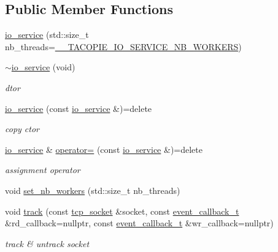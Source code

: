 \subsection*{Public Member Functions}
\begin{DoxyCompactItemize}
\item 
\hyperlink{classtacopie_1_1io__service_a62edde9b62571610413d99d075df8102}{io\+\_\+service} (std\+::size\+\_\+t nb\+\_\+threads=\hyperlink{io__service_8hpp_a822f465d034836ecbc765ad422eec064}{\+\_\+\+\_\+\+T\+A\+C\+O\+P\+I\+E\+\_\+\+I\+O\+\_\+\+S\+E\+R\+V\+I\+C\+E\+\_\+\+N\+B\+\_\+\+W\+O\+R\+K\+E\+RS})
\item 
\hyperlink{classtacopie_1_1io__service_ae423d7e4b13f07fe41fb051345ffbf8d}{$\sim$io\+\_\+service} (void)
\begin{DoxyCompactList}\small\item\em dtor \end{DoxyCompactList}\item 
\hyperlink{classtacopie_1_1io__service_ad5da7503d8fec083c6d28455ec9e21c7}{io\+\_\+service} (const \hyperlink{classtacopie_1_1io__service}{io\+\_\+service} \&)=delete
\begin{DoxyCompactList}\small\item\em copy ctor \end{DoxyCompactList}\item 
\hyperlink{classtacopie_1_1io__service}{io\+\_\+service} \& \hyperlink{classtacopie_1_1io__service_a980652008516b38357d405c16eda07fa}{operator=} (const \hyperlink{classtacopie_1_1io__service}{io\+\_\+service} \&)=delete
\begin{DoxyCompactList}\small\item\em assignment operator \end{DoxyCompactList}\item 
void \hyperlink{classtacopie_1_1io__service_a7e2b0700c0a4591f86c344df8748b3a5}{set\+\_\+nb\+\_\+workers} (std\+::size\+\_\+t nb\+\_\+threads)
\item 
void \hyperlink{classtacopie_1_1io__service_a9f4c8bce3c0f6d660515b0b5eb109df8}{track} (const \hyperlink{classtacopie_1_1tcp__socket}{tcp\+\_\+socket} \&socket, const \hyperlink{classtacopie_1_1io__service_abb66850c32d9c724f4418d77bd04bcfd}{event\+\_\+callback\+\_\+t} \&rd\+\_\+callback=nullptr, const \hyperlink{classtacopie_1_1io__service_abb66850c32d9c724f4418d77bd04bcfd}{event\+\_\+callback\+\_\+t} \&wr\+\_\+callback=nullptr)
\begin{DoxyCompactList}\small\item\em track \& untrack socket \end{DoxyCompactList}\item 

\end{DoxyCompactItemize}
